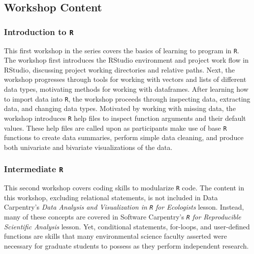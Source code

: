 \documentclass[12pt]{article}
\begin{document}
\subsection{Workshop Content}

\subsubsection{Introduction to \texttt{R}}
\label{sec:introR}

\quad This first workshop in the series covers the basics of learning to program
in \texttt{R}. The workshop first introduces the RStudio environment and project
work flow in RStudio, discussing project working directories and relative paths.
Next, the workshop progresses through tools for working with vectors and lists 
of different data types, motivating methods for working with dataframes. After
learning how to import data into \texttt{R}, the workshop proceeds through
inspecting data, extracting data, and changing data types. Motivated by working
with missing data, the workshop introduces \texttt{R} help files to inspect
function arguments and their default values. These help files are called upon
as participants make use of base \texttt{R} functions to create data summaries,
perform simple data cleaning, and produce both univariate and bivariate
visualizations of the data. 

\subsubsection{Intermediate \texttt{R}}
\label{sec:intermed}

\quad This second workshop covers coding skills to modularize \texttt{R} code. 
The content in this workshop, excluding relational statements, is not
included in Data Carpentry's \emph{Data Analysis and Visualization in \texttt{R}
for Ecologists} lesson. Instead, many of these concepts are covered in Software
Carpentry's \emph{\texttt{R} for Reproducible Scientific Analysis} lesson. Yet,
conditional statements, for-loops, and user-defined functions are skills that
many environmental science faculty asserted were necessary for graduate students
to possess as they perform independent research. 
\end{document}
